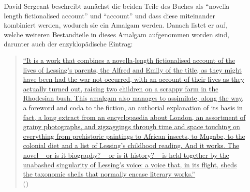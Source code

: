 \documentclass[fontsize=12pt]{scrartcl}
\begin{document}
David Sergeant beschreibt zun\"achst die beiden Teile des Buches als "`novella-length fictionalised account"' und "`account"' und dass diese miteinander kombiniert werden, wodurch sie ein Amalgam werden. Danach listet er auf, welche weiteren Bestandteile in dieses Amalgam aufgenommen worden sind, darunter auch der enzyklop\"adische Eintrag:

\singlespacing
\begin{quote}
\href{http://www.oxonianreview.org/wp/stories-to-herself/}{"`It is a work that combines a novella-length fictionalised account of the lives of Lessing's parents, the Alfred and Emily of the title, as they might have been had the war not occurred, with an account of their lives as they actually turned out, raising two children on a scrappy farm in the Rhodesian bush. This amalgam also manages to assimilate, along the way, a foreword and coda to the fiction, an authorial explanation of its basis in fact, a long extract from an encyclopaedia about London, an assortment of grainy photographs, and zigzaggings through time and space touching on everything from prehistoric paintings to African insects, to Mugabe, to the colonial diet and a list of Lessing's childhood reading. And it works. The novel -- or is it biography? -- or is it history? -- is held together by the unabashed singularity of Lessing's voice: a voice that, in its flight, sheds the taxonomic shells that normally encase literary works."'}\\ (\cite{Sergeant2008})
\end{quote} 
\onehalfspacing
\end{document}
